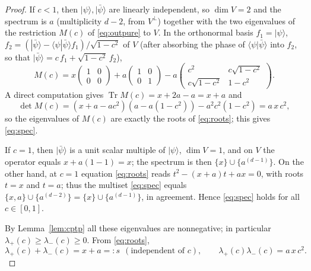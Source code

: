 \documentclass{amsart}
\theoremstyle{definition}
\DeclareMathOperator{\Tr}{Tr}
\begin{document}
\begin{proof}
If $c<1$, then $|\psi\rangle,|\bar\psi\rangle$ are linearly independent, so
$\dim V=2$ and the spectrum is $a$ (multiplicity $d-2$, from $V^{\perp}$)
together with the two eigenvalues of the restriction $M(c)$ of
\eqref{eq:outpure} to $V$. In the orthonormal basis $f_1=|\psi\rangle$,
$f_2=(|\bar\psi\rangle-\langle\psi|\bar\psi\rangle f_1)/\sqrt{1-c^{2}}$ of $V$
(after absorbing the phase of $\langle\psi|\bar\psi\rangle$ into $f_2$, so that
$|\bar\psi\rangle=c\,f_1+\sqrt{1-c^{2}}\,f_2$),
\[
M(c)=x\begin{pmatrix}1&0\\0&0\end{pmatrix}
+a\begin{pmatrix}1&0\\0&1\end{pmatrix}
-a\begin{pmatrix}c^{2}&c\sqrt{1-c^{2}}\\c\sqrt{1-c^{2}}&1-c^{2}\end{pmatrix}.
\]
A direct computation gives $\Tr M(c)=x+2a-a=x+a$ and
\[
\det M(c)=(x+a-ac^{2})(a-a(1-c^{2}))-a^{2}c^{2}(1-c^{2})=a\,x\,c^{2},
\]
so the eigenvalues of $M(c)$ are exactly the roots of \eqref{eq:roots}; this
gives \eqref{eq:spec}.

If $c=1$, then $|\bar\psi\rangle$ is a unit scalar multiple of $|\psi\rangle$,
$\dim V=1$, and on $V$ the operator equals $x+a(1-1)=x$; the spectrum is then
$\{x\}\cup\{a^{(d-1)}\}$. On the other hand, at $c=1$ equation \eqref{eq:roots}
reads $t^{2}-(x+a)t+ax=0$, with roots $t=x$ and $t=a$; thus the multiset
\eqref{eq:spec} equals $\{x,a\}\cup\{a^{(d-2)}\}=\{x\}\cup\{a^{(d-1)}\}$, in
agreement. Hence \eqref{eq:spec} holds for all $c\in[0,1]$.

By Lemma~\ref{lem:cptp} all these eigenvalues are nonnegative; in particular
$\lambda_+(c)\ge\lambda_-(c)\ge0$. From \eqref{eq:roots},
\begin{equation}\label{eq:sumprod}
\lambda_+(c)+\lambda_-(c)=x+a=:s\ \ (\text{independent of }c),\qquad
\lambda_+(c)\lambda_-(c)=a\,x\,c^{2}.
\end{equation}


\end{proof}
\end{document}
